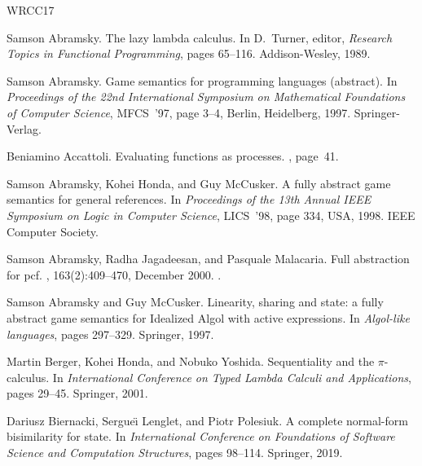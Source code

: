 \documentclass[11pt,a4paper]{amsart}
\theoremstyle{plain}
\theoremstyle{definition}
\theoremstyle{defC}
\theoremstyle{thmC}
\theoremstyle{plain}
\numberwithin{equation}{section}
\theoremstyle{plain}
\theoremstyle{definition}
\begin{document}


\begin{thebibliography}{WRCC17}

Samson Abramsky.
\newblock The lazy lambda calculus.
\newblock In D.~Turner, editor, {\em Research Topics in Functional
  Programming}, pages 65--116. Addison-Wesley, 1989.

Samson Abramsky.
\newblock Game semantics for programming languages (abstract).
\newblock In {\em Proceedings of the 22nd International Symposium on
  Mathematical Foundations of Computer Science}, MFCS~'97, page 3–4, Berlin,
  Heidelberg, 1997. Springer-Verlag.

Beniamino Accattoli.
\newblock Evaluating functions as processes.
, page~41.

Samson Abramsky, Kohei Honda, and Guy McCusker.
\newblock A fully abstract game semantics for general references.
\newblock In {\em Proceedings of the 13th Annual IEEE Symposium on Logic in
  Computer Science}, LICS~'98, page 334, USA, 1998. IEEE Computer Society.

Samson Abramsky, Radha Jagadeesan, and Pasquale Malacaria.
\newblock Full abstraction for pcf.
, 163(2):409–470, December 2000.
\newblock \href {https://doi.org/10.1006/inco.2000.2930}
  {}.

Samson Abramsky and Guy McCusker.
\newblock Linearity, sharing and state: a fully abstract game semantics for
  {I}dealized {A}lgol with active expressions.
\newblock In {\em Algol-like languages}, pages 297--329. Springer, 1997.

Martin Berger, Kohei Honda, and Nobuko Yoshida.
\newblock Sequentiality and the $\pi$-calculus.
\newblock In {\em International Conference on Typed Lambda Calculi and
  Applications}, pages 29--45. Springer, 2001.

Dariusz Biernacki, Sergue{\"\i} Lenglet, and Piotr Polesiuk.
\newblock A complete normal-form bisimilarity for state.
\newblock In {\em International Conference on Foundations of Software Science
  and Computation Structures}, pages 98--114. Springer, 2019.


\end{thebibliography}
\end{document}
